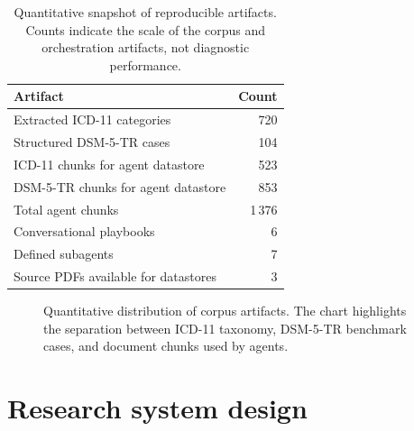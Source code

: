 \documentclass[11pt,a4paper]{article}
\begin{document}
\begin{table}[htbp]
\centering
\begin{tabular}{lr}
\toprule
\textbf{Artifact} & \textbf{Count}\\
\midrule
Extracted ICD-11 categories & 720\\
Structured DSM-5-TR cases & 104\\
ICD-11 chunks for agent datastore & 523\\
DSM-5-TR chunks for agent datastore & 853\\
Total agent chunks & 1\,376\\
Conversational playbooks & 6\\
Defined subagents & 7\\
Source PDFs available for datastores & 3\\
\bottomrule
\end{tabular}
\caption{Quantitative snapshot of reproducible artifacts. Counts indicate the scale of the corpus and orchestration artifacts, not diagnostic performance.}
\label{tab:repo-snapshot-en}
\end{table}

\begin{figure}[htbp]
\centering
{}
\caption{Quantitative distribution of corpus artifacts. The chart highlights the separation between ICD-11 taxonomy, DSM-5-TR benchmark cases, and document chunks used by agents.}
\label{fig:repo-snapshot-chart-en}
\end{figure}

\section{Research system design}
\end{document}
